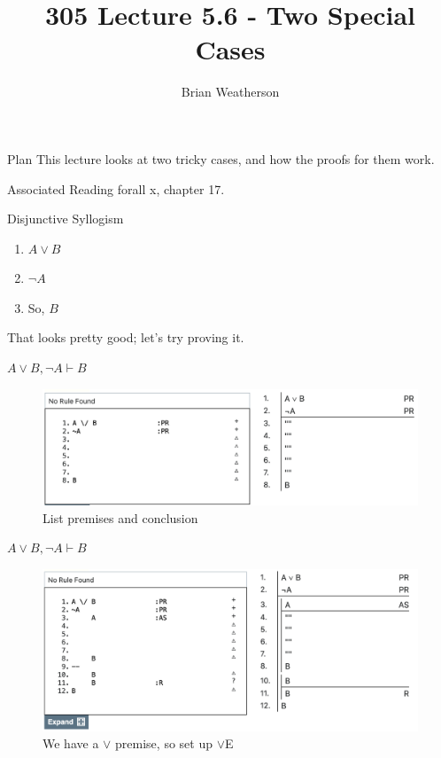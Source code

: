 \documentclass[
  ignorenonframetext,
]{beamer}
\title{305 Lecture 5.6 - Two Special Cases}
\author{Brian Weatherson}
\date{}
\providecommand{\tightlist}{%
  \setlength{\itemsep}{0pt}\setlength{\parskip}{0pt}}
\renewcommand{\,}{\text{, }}
\begin{document}
\frame{\titlepage}

\begin{frame}{Plan}
\protect\hypertarget{plan}{}
This lecture looks at two tricky cases, and how the proofs for them
work.
\end{frame}

\begin{frame}{Associated Reading}
\protect\hypertarget{associated-reading}{}
forall x, chapter 17.
\end{frame}

\begin{frame}{Disjunctive Syllogism}
\protect\hypertarget{disjunctive-syllogism}{}
\begin{enumerate}
\tightlist
\item
  \(A \vee B\)
\item
  \(\neg A\)
\item
  So, \(B\)
\end{enumerate}

That looks pretty good; let's try proving it.
\end{frame}

\begin{frame}{\(A \vee B, \neg A \vdash B\)}
\protect\hypertarget{a-vee-b-neg-a-vdash-b}{}
\begin{figure}
\centering
\includegraphics[width=\textwidth,height=0.75\textheight]{5_6a.png}
\caption{List premises and conclusion}
\end{figure}
\end{frame}

\begin{frame}{\(A \vee B, \neg A \vdash B\)}
\protect\hypertarget{a-vee-b-neg-a-vdash-b-1}{}
\begin{figure}
\centering
\includegraphics[width=\textwidth,height=0.75\textheight]{5_6b.png}
\caption{We have a \(\vee\) premise, so set up \(\vee\)E}
\end{figure}
\end{frame}
\end{document}
